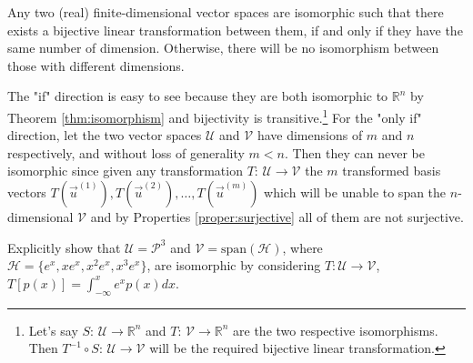 \begin{proper}
\label{proper:isomorphicsamerank}
Any two (real) finite-dimensional vector spaces are isomorphic such that there exists a bijective linear transformation between them, if and only if they have the same number of dimension. Otherwise, there will be no isomorphism between those with different dimensions.
\end{proper}
The "if" direction is easy to see because they are both isomorphic to $\mathbb{R}^n$ by Theorem \ref{thm:isomorphism} and bijectivity is transitive.\footnote{Let's say $S$: $\mathcal{U} \to \mathbb{R}^n$ and $T$: $\mathcal{V} \to \mathbb{R}^n$ are the two respective isomorphisms. Then $T^{-1} \circ S$: $\mathcal{U} \to \mathcal{V}$ will be the required bijective linear transformation.} For the "only if" direction, let the two vector spaces $\mathcal{U}$ and $\mathcal{V}$ have dimensions of $m$ and $n$ respectively, and without loss of generality $m < n$. Then they can never be isomorphic since given any transformation $T$: $\mathcal{U} \to \mathcal{V}$ the $m$ transformed basis vectors $T(\vec{u}^{(1)}), T(\vec{u}^{(2)}), \ldots, T(\vec{u}^{(m)})$ which will be unable to span the $n$-dimensional $\mathcal{V}$ and by Properties \ref{proper:surjective} all of them are not surjective.
\begin{exmp}
Explicitly show that $\mathcal{U} = \mathcal{P}^3$ and $\mathcal{V} = \text{span}(\mathcal{H})$, where $\mathcal{H} = \{e^x, xe^x, x^2e^x, x^3e^x\}$, are isomorphic by considering $T: \mathcal{U} \to \mathcal{V}$, $T[p(x)] = \int_{-\infty}^x e^x p(x) dx$.
\end{exmp}
